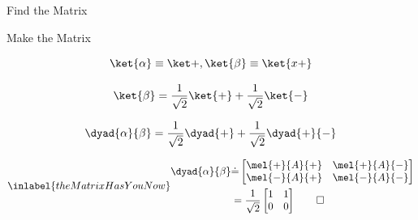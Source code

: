 \begin{answer}
\begin{answerpart}{Find the Matrix}
\end{answerpart}



\begin{answerpart}{Make the Matrix}

  \begin{equation}
    \ket{\alpha} \equiv \ket +, \ket{\beta} \equiv \ket{x+}
  \end{equation}

  \begin{equation}
    \ket{\beta} = \frac{1}{\sqrt{2}}\ket{+} + \frac{1}{\sqrt{2}}\ket{-}
  \end{equation}

  \begin{equation}
    \dyad{\alpha}{\beta} = \frac{1}{\sqrt{2}}\dyad{+} + \frac{1}{\sqrt{2}}\dyad{+}{-}
  \end{equation}
  
  \begin{equation}
    \inlabel{theMatrixHasYouNow}
    \begin{split}
      \dyad{\alpha}{\beta}
      &\dot{=}
      \begin{bmatrix}
        \mel{+}{A}{+} & \mel{+}{A}{-}\\
        \mel{-}{A}{+} & \mel{-}{A}{-}\\
      \end{bmatrix}\\
      &=
      \frac{1}{\sqrt{2}}
      \begin{bmatrix}
        1 & 1\\
        0 & 0\\
      \end{bmatrix}\qed
    \end{split}
  \end{equation}
  
\end{answerpart}
\end{answer}
